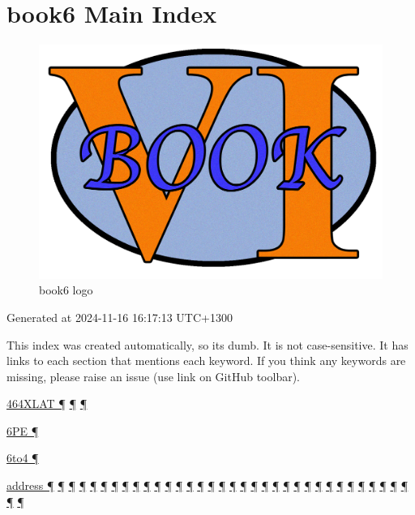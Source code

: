 \documentclass[
]{article}
\begin{document}
\section{book6 Main Index}\label{book6-main-index}

\begin{figure}
\centering
\includegraphics{book6logo.png}
\caption{book6 logo}
\end{figure}

Generated at 2024-11-16 16:17:13 UTC+1300

This index was created automatically, so it\textquotesingle s dumb. It
is not case-sensitive. It has links to each section that mentions each
keyword. If you think any keywords are missing, please raise an issue
(use link on GitHub toolbar).

\hyperref[dual-stack-scenarios]{464XLAT ¶}
\hyperref[translation-and-ipv4-as-a-service]{¶}
\hyperref[deployment-by-carriers]{¶}

\hyperref[tunnels]{6PE ¶}

\hyperref[obsolete-techniques]{6to4 ¶}

\hyperref[how-a-user-sees-ipv6]{address ¶}
\hyperref[how-an-application-programmer-sees-ipv6]{¶}
\hyperref[why-version-6]{¶} \hyperref[ipv6-basic-technology]{¶}
\hyperref[address-resolution]{¶} \hyperref[addresses]{¶}
\hyperref[auto-configuration]{¶} \hyperref[dns]{¶}
\hyperref[layer-2-functions]{¶} \hyperref[managed-configuration]{¶}
\hyperref[packet-format]{¶} \hyperref[routing]{¶}
\hyperref[source-and-destination-address-selection]{¶}
\hyperref[coexistence-with-legacy-ipv4]{¶}
\hyperref[dual-stack-scenarios]{¶}
\hyperref[ipv6-primary-differences-from-ipv4]{¶}
\hyperref[obsolete-techniques]{¶}
\hyperref[translation-and-ipv4-as-a-service]{¶} \hyperref[tunnels]{¶}
\hyperref[security]{¶} \hyperref[filtering]{¶}
\hyperref[layer-2-considerations]{¶} \hyperref[topology-obfuscation]{¶}
\hyperref[network-design]{¶} \hyperref[address-planning]{¶}
\hyperref[prefix-per-host]{¶}
\hyperref[address-and-prefix-management]{¶}
\hyperref[energy-consumption]{¶} \hyperref[multi-prefix-operation]{¶}
\hyperref[multihoming]{¶} \hyperref[cern-and-the-lhc]{¶}
\hyperref[deployment-by-carriers]{¶}
\hyperref[deployment-in-the-enterprise]{¶}
\hyperref[deployment-in-the-home]{¶} \hyperref[tools]{¶}
\hyperref[markdown-usage]{¶}
\end{document}
